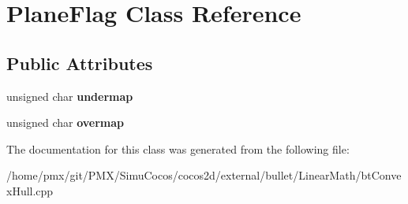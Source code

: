 \hypertarget{classPlaneFlag}{}\section{Plane\+Flag Class Reference}
\label{classPlaneFlag}
\subsection*{Public Attributes}
\begin{DoxyCompactItemize}
\item 
\mbox{\label{classPlaneFlag_a3c4bbb24542a57277d7ec002b1b76b9c}} 
unsigned char {\bfseries undermap}
\item 
\mbox{\label{classPlaneFlag_a2c0042d0e6b50e2652542500997c5841}} 
unsigned char {\bfseries overmap}
\end{DoxyCompactItemize}


The documentation for this class was generated from the following file\+:\begin{DoxyCompactItemize}
\item 
/home/pmx/git/\+P\+M\+X/\+Simu\+Cocos/cocos2d/external/bullet/\+Linear\+Math/bt\+Convex\+Hull.\+cpp\end{DoxyCompactItemize}
